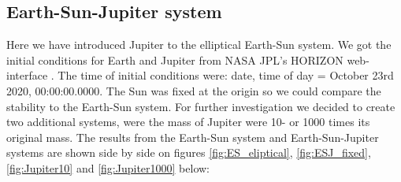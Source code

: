 \documentclass[american,a4paper,12pt]{article}
\begin{document}
\subsection{Earth-Sun-Jupiter system}
Here we have introduced Jupiter to the elliptical Earth-Sun system. We got the initial conditions for Earth and Jupiter from NASA JPL's HORIZON web-interface \cite{JPL}. The time of initial conditions were: date, time of day = October 23rd 2020, 00:00:00.0000. The Sun was fixed at the origin so we could compare the stability to the Earth-Sun system. For further investigation we decided to create two additional systems, were the mass of Jupiter were 10- or 1000 times its original mass. The results from the Earth-Sun system and Earth-Sun-Jupiter systems are shown side by side on figures \ref{fig:ES_eliptical}, \ref{fig:ESJ_fixed}, \ref{fig:Jupiter10} and \ref{fig:Jupiter1000} below:
\end{document}
